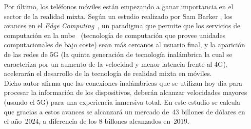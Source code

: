 

Por último, los teléfonos móviles están empezando a ganar importancia en el sector de la realidad mixta. Según un estudio realizado por Sam Barker \cite{juniperArMrmoney}, los avances en el \textit{Edge Computing}~\cite{edgeComputing}, un paradigma que permite que los servicios de computación en la nube~\cite{cloudComputing} (tecnología de computación que provee unidades computacionales de bajo coste) sean más cercanos al usuario final, y la aparición de las redes de 5G (la quinta generación de tecnología inalámbrica la cual se caracteriza por un aumento de la velocidad y menor latencia frente al 4G), acelerarán el desarrollo de la tecnología de realidad mixta en móviles.\\

Dicho autor afirma que las conexiones inalámbricas que se utilizan hoy día para procesar la información de los dispositivos, deberán alcanzar velocidades mayores (usando el 5G) para una experiencia inmersiva total. En este estudio se calcula que gracias a estos avances se alcanzará un mercado de~43 billones de dólares en el año~2024, a diferencia de los 8 billones alcanzados en~2019.













